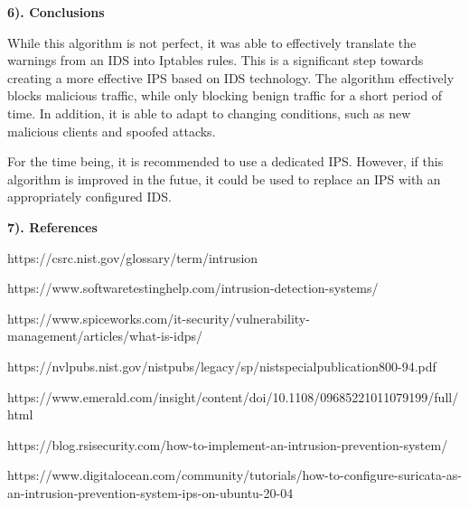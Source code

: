 \documentclass[12pt]{article}
\newcommand{\bibent}{\noindent \hangindent 40pt}
\newenvironment{workscited}{\newpage \textbf{7). References}}{\newpage }
\begin{document}
\begin{flushleft}
\begin{multicols}{2}
\textbf{6). Conclusions}

While this algorithm is not perfect, it was able to effectively translate the warnings from an IDS into Iptables rules. This is a significant step towards creating a more effective IPS based on IDS technology. The algorithm effectively blocks malicious traffic, while only blocking benign traffic for a short period of time. In addition, it is able to adapt to changing conditions, such as new malicious clients and spoofed attacks.

For the time being, it is recommended to use a dedicated IPS. However, if this algorithm is improved in the futue, it could be used to replace an IPS with an appropriately configured IDS.

\end{multicols}


\newpage

\begin{workscited}

https://csrc.nist.gov/glossary/term/intrusion

https://www.softwaretestinghelp.com/intrusion-detection-systems/

https://www.spiceworks.com/it-security/vulnerability-management/articles/what-is-idps/

https://nvlpubs.nist.gov/nistpubs/legacy/sp/nistspecialpublication800-94.pdf

https://www.emerald.com/insight/content/doi/10.1108/09685221011079199/full/html

https://blog.rsisecurity.com/how-to-implement-an-intrusion-prevention-system/

https://www.digitalocean.com/community/tutorials/how-to-configure-suricata-as-an-intrusion-prevention-system-ips-on-ubuntu-20-04






\end{workscited}

\end{flushleft}
\end{document}
